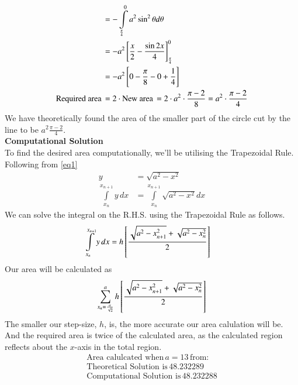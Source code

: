 \documentclass[journal]{IEEEtran}
\begin{document}
\begin{align}
	&= -\int\limits_{\frac{\pi}{4}}^{0} a^2 \sin^2\theta d\theta\\
	&= -a^2{}\left[\frac{x}{2}-\frac{\sin2x}{4}\right]_{\frac{\pi}{4}}^{0}\\
	&= -a^2{}\left[0 -\frac{\pi}{8} - 0 + \frac{1}{4}\right]\\
	\text{Required area}\, &= 2\cdot\text{New area} \, = 2\cdot a^2\cdot\frac{\pi-2}{8} = a^2\cdot\frac{\pi-2}{4}
\end{align}
We have theoretically found the area of the smaller part of the circle cut by the line to be $a^2 \frac{\pi-2}{4}$.\\
\textbf{Computational Solution}\\
To find the desired area computationally, we'll be utilising the Trapezoidal Rule.\\
Following from \ref{eq1}
\begin{align}
	y &= \sqrt{a^2-x^2} \nonumber\\
	\int\limits_{x_n}^{x_{n+1}} y \, dx &= \int\limits_{x_n}^{x_{n+1}} \sqrt{a^2-x^2} dx
\end{align}
We can solve the integral on the R.H.S. using the Trapezoidal Rule as follows.
\begin{align}
	\int\limits_{x_n}^{x_{n+1}} y \, dx &= h{}\left[\frac{\sqrt{a^2-x_{n+1}^2} + \sqrt{a^2-x_n^2}}{2}\right]
\end{align}
Our area will be calculated as
\begin{align}
	\sum\limits_{x_n = \frac{a}{\sqrt{2}}}^{a} h{}\left[\frac{\sqrt{a^2-x_{n+1}^2} + \sqrt{a^2-x_n^2}}{2}\right]
\end{align}
The smaller our step-size, $h$, is, the more accurate our area calulation will be.\\
And the required area is twice of the calculated area, as the calculated region reflects about the $x$-axis in the total region.
\begin{align*}
	\text{Area calulcated when}\, a=13 \,\text{from:}\\
	\text{Theoretical Solution is}\, 48.232289\\
	\text{Computational Solution is}\, 48.232288
\end{align*}
\end{document}
